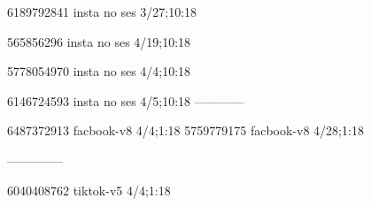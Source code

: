 6189792841 insta no ses
3/27;10:18

565856296 insta no ses
4/19;10:18

5778054970 insta no ses
4/4;10:18

6146724593 insta no ses
4/5;10:18
------------

6487372913 facbook-v8
4/4;1:18
5759779175 facbook-v8
4/28;1:18


--------------

6040408762 tiktok-v5
4/4;1:18
